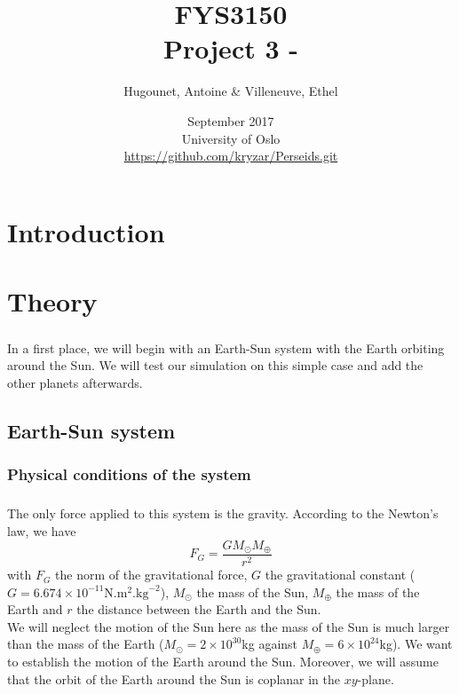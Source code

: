 \documentclass[a4paper, twoside, 11pt]{report}
\title{FYS3150\\Project 3 - }
\author{Hugounet, Antoine \& Villeneuve, Ethel}
\date{September 2017 \\University of Oslo \\ \url{https://github.com/kryzar/Perseids.git}}
\theoremstyle{theorem}
\theoremstyle{remark}
\theoremstyle{exemple}
\begin{document}
\maketitle
	
	
\begin{abstract}

	\paragraph{}
	
\end{abstract}


\tableofcontents


\chapter*{Introduction}

    \paragraph{}
    

\chapter{Theory}
    
    \paragraph{}In a first place, we will begin with an Earth-Sun system with the Earth orbiting around the Sun. We will test our simulation on this simple case and add the other planets afterwards. 

    \section{Earth-Sun system}
        \subsection{Physical conditions of the system}
            \paragraph{}The only force applied to this system is the gravity. According to the Newton's law, we have 
                \begin{equation}
                F_G = \frac{GM_{\odot}M_{\oplus}}{r^2}
                \end{equation}
            with $F_G$ the norm of the gravitational force, $G$ the gravitational constant ($G=6.674 \times 10^{-11} \mathrm{N}.\mathrm{m}^2.\mathrm{kg}^{-2}$), $M_{\odot}$ the mass of the Sun, $M_{\oplus}$ the mass of the Earth and $r$ the distance between the Earth and the Sun.\\
            We will neglect the motion of the Sun here as the mass of the Sun is much larger than the mass of the Earth ($M_{\odot} = 2 \times 10^{30}$kg against $M_{\oplus} = 6 \times 10^{24}$kg). We want to establish the motion of the Earth around the Sun. Moreover, we will assume that the orbit of the Earth around the Sun is coplanar in the $xy$-plane.
\end{document}
